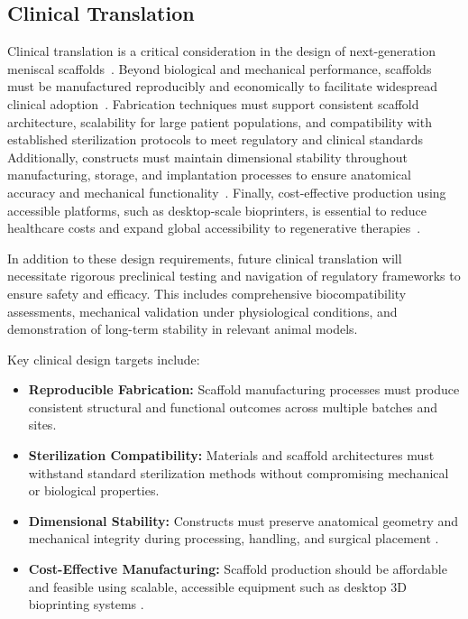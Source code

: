 \subsection{Clinical Translation}

Clinical translation is a critical consideration in the design of next-generation meniscal scaffolds~\cite{sun2017overviewscaffold}.
Beyond biological and mechanical performance, scaffolds must be manufactured reproducibly and economically to facilitate widespread clinical adoption~\cite{luis20203ddirect, xiao2013mechanicaltesting}.
Fabrication techniques must support consistent scaffold architecture, scalability for large patient populations, and compatibility with established sterilization protocols to meet regulatory and clinical standards~\cite{gupta2020meniscaltissue,}
Additionally, constructs must maintain dimensional stability throughout manufacturing, storage, and implantation processes to ensure anatomical accuracy and mechanical functionality~\cite{norberg2021viscoelasticequilibrium, woodruff2010returnforgotten}.
Finally, cost-effective production using accessible platforms, such as desktop-scale bioprinters, is essential to reduce healthcare costs and expand global accessibility to regenerative therapies~\cite{sooriyaarachchi2019hybridfabrication, fares2018interpenetratingnetwork, gautam2013fabricationcharacterization, elkommos2025hybridhydrogels}.

In addition to these design requirements, future clinical translation will necessitate rigorous preclinical testing and navigation of regulatory frameworks to ensure safety and efficacy.
This includes comprehensive biocompatibility assessments, mechanical validation under physiological conditions, and demonstration of long-term stability in relevant animal models.

Key clinical design targets include:

\begin{itemize}
    \item \textbf{Reproducible Fabrication:} Scaffold manufacturing processes must produce consistent structural and functional outcomes across multiple batches and sites.
    
    \item \textbf{Sterilization Compatibility:} Materials and scaffold architectures must withstand standard sterilization methods without compromising mechanical or biological properties.
    
    \item \textbf{Dimensional Stability:} Constructs must preserve anatomical geometry and mechanical integrity during processing, handling, and surgical placement \cite{Beaufils2017, makris2011kneemeniscus}.
    
    \item \textbf{Cost-Effective Manufacturing:} Scaffold production should be affordable and feasible using scalable, accessible equipment such as desktop 3D bioprinting systems \cite{bahcecioglu20193dprinted,klarmann20233dprinting,elkommos2025hybridhydrogels}.
\end{itemize}

